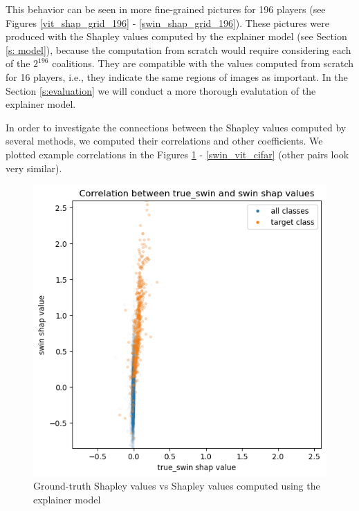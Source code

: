 \documentclass[magisterska,en]{pracamgr}
\begin{document}
This behavior can be seen in more fine-grained pictures for 196 players (see Figures \ref{vit_shap_grid_196} - \ref{swin_shap_grid_196}). These pictures were produced with the Shapley values computed by the explainer model (see Section \ref{s: model}), because the computation from scratch would require considering each of the $2^{196}$ coalitions. They are compatible with the values computed from scratch for 16 players, i.e., they indicate the same regions of images as important. In the Section \ref{s:evaluation} we will conduct a more thorough evalutation of the explainer model.




In order to investigate the connections between the Shapley values computed by several methods, we computed their correlations and other coefficients. We plotted example correlations in the Figures \ref{true_swin_swin_cifar} - \ref{swin_vit_cifar} (other pairs look very similar). 



\begin{figure}[H]
\centering
\includegraphics[scale=0.5]{./images/true_swin_swin_cifar.png}
\caption{Ground-truth Shapley values vs Shapley values computed using the explainer model}
\label{true_swin_swin_cifar}
\end{figure}
\end{document}
